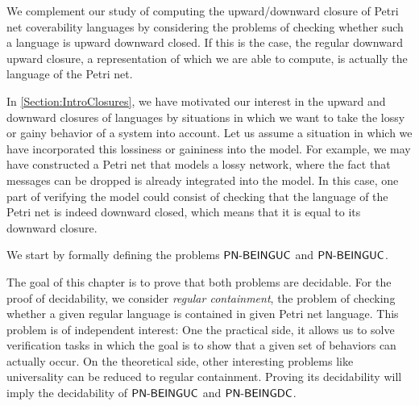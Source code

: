 \documentclass[../../diss.tex]{subfiles}
\begin{document}

We complement our study of computing the upward/downward closure of Petri net coverability languages by considering the problems of checking whether such a language is upward \resp downward closed.
If this is the case, the regular downward \resp upward closure, a representation of which we are able to compute, is actually the language of the Petri net.

In \cref{Section:IntroClosures}, we have motivated our interest in the upward and downward closures of languages by situations in which we want to take the lossy or gainy behavior of a system into account.
Let us assume a situation in which we have incorporated this lossiness or gaininess into the model.
For example, we may have constructed a Petri net that models a lossy network, where the fact that messages can be dropped is already integrated into the model.
In this case, one part of verifying the model could consist of checking that the language of the Petri net is indeed downward closed, which means that it is equal to its downward closure.

We start by formally defining the problems $\PNCOVUC$ and $\PNCOVUC$.

\begin{problem}
    \problemshort{($\PNCOVUC$)}
\end{problem}

\begin{problem}
    \problemshort{($\PNCOVDC$)}
\end{problem}

The goal of this chapter is to prove that both problems are decidable.
For the proof of decidability, we consider \emph{regular containment}, the problem of checking whether a given regular language is contained in given Petri net language.
This problem is of independent interest:
One the practical side, it allows us to solve verification tasks in which the goal is to show that a given set of behaviors can actually occur.
On the theoretical side, other interesting problems like universality can be reduced to regular containment.
Proving its decidability will imply the decidability of $\PNCOVUC$ and $\PNCOVDC$.
\end{document}
